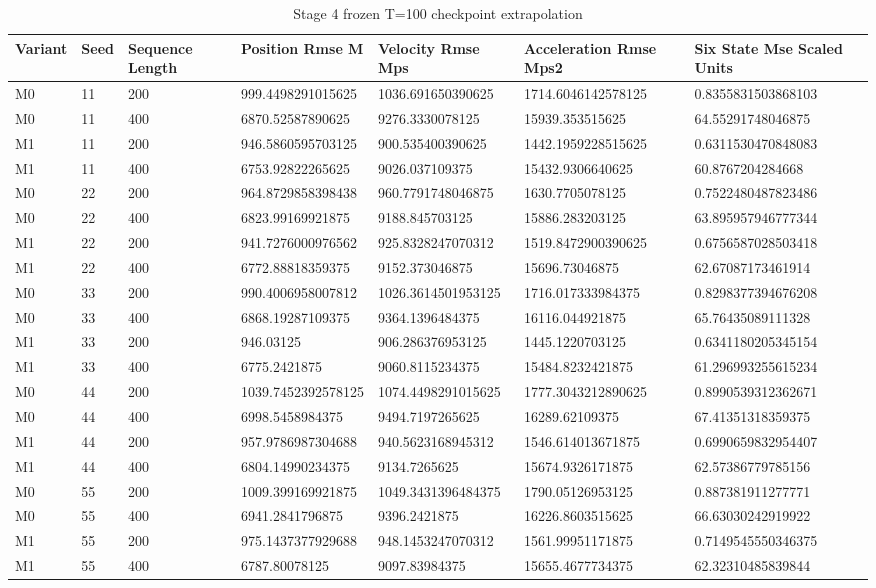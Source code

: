 \begin{table}[t]
\centering
\caption{Stage 4 frozen T=100 checkpoint extrapolation}
\label{tab:stage4}
\scriptsize
\begin{tabular}{lllllll}
\hline
Variant & Seed & Sequence Length & Position Rmse M & Velocity Rmse Mps & Acceleration Rmse Mps2 & Six State Mse Scaled Units \\
\hline
M0 & 11 & 200 & 999.4498291015625 & 1036.691650390625 & 1714.6046142578125 & 0.8355831503868103 \\
M0 & 11 & 400 & 6870.52587890625 & 9276.3330078125 & 15939.353515625 & 64.55291748046875 \\
M1 & 11 & 200 & 946.5860595703125 & 900.535400390625 & 1442.1959228515625 & 0.6311530470848083 \\
M1 & 11 & 400 & 6753.92822265625 & 9026.037109375 & 15432.9306640625 & 60.8767204284668 \\
M0 & 22 & 200 & 964.8729858398438 & 960.7791748046875 & 1630.7705078125 & 0.7522480487823486 \\
M0 & 22 & 400 & 6823.99169921875 & 9188.845703125 & 15886.283203125 & 63.895957946777344 \\
M1 & 22 & 200 & 941.7276000976562 & 925.8328247070312 & 1519.8472900390625 & 0.6756587028503418 \\
M1 & 22 & 400 & 6772.88818359375 & 9152.373046875 & 15696.73046875 & 62.67087173461914 \\
M0 & 33 & 200 & 990.4006958007812 & 1026.3614501953125 & 1716.017333984375 & 0.8298377394676208 \\
M0 & 33 & 400 & 6868.19287109375 & 9364.1396484375 & 16116.044921875 & 65.76435089111328 \\
M1 & 33 & 200 & 946.03125 & 906.286376953125 & 1445.1220703125 & 0.6341180205345154 \\
M1 & 33 & 400 & 6775.2421875 & 9060.8115234375 & 15484.8232421875 & 61.296993255615234 \\
M0 & 44 & 200 & 1039.7452392578125 & 1074.4498291015625 & 1777.3043212890625 & 0.8990539312362671 \\
M0 & 44 & 400 & 6998.5458984375 & 9494.7197265625 & 16289.62109375 & 67.41351318359375 \\
M1 & 44 & 200 & 957.9786987304688 & 940.5623168945312 & 1546.614013671875 & 0.6990659832954407 \\
M1 & 44 & 400 & 6804.14990234375 & 9134.7265625 & 15674.9326171875 & 62.57386779785156 \\
M0 & 55 & 200 & 1009.399169921875 & 1049.3431396484375 & 1790.05126953125 & 0.887381911277771 \\
M0 & 55 & 400 & 6941.2841796875 & 9396.2421875 & 16226.8603515625 & 66.63030242919922 \\
M1 & 55 & 200 & 975.1437377929688 & 948.1453247070312 & 1561.99951171875 & 0.7149545550346375 \\
M1 & 55 & 400 & 6787.80078125 & 9097.83984375 & 15655.4677734375 & 62.32310485839844 \\
\hline
\end{tabular}
\end{table}

